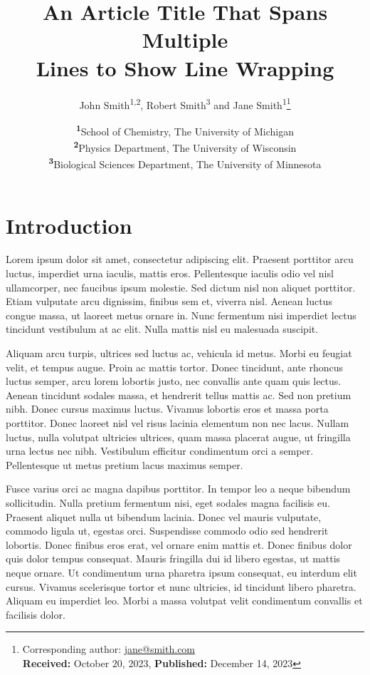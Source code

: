 \documentclass[
a4paper, %
10pt, %
unnumberedsections, %
twoside, %
]{LTJournalArticle}
\title{An Article Title That Spans Multiple\\ Lines to Show Line Wrapping} %
\author{%
	John Smith\textsuperscript{1,2}, Robert Smith\textsuperscript{3} and Jane Smith\textsuperscript{1}\thanks{Corresponding author: \href{mailto:jane@smith.com}{jane@smith.com}\\ \textbf{Received:} October 20, 2023, \textbf{Published:} December 14, 2023}
}
\date{\footnotesize\textsuperscript{\textbf{1}}School of Chemistry, The University of Michigan\\ \textsuperscript{\textbf{2}}Physics Department, The University of Wisconsin\\ \textsuperscript{\textbf{3}}Biological Sciences Department, The University of Minnesota}
\begin{document}
	
	\maketitle %
	
	
	\section{Introduction}
	
	Lorem ipsum dolor sit amet, consectetur adipiscing elit. Praesent porttitor arcu luctus, imperdiet urna iaculis, mattis eros. Pellentesque iaculis odio vel nisl ullamcorper, nec faucibus ipsum molestie. Sed dictum nisl non aliquet porttitor. Etiam vulputate arcu dignissim, finibus sem et, viverra nisl. Aenean luctus congue massa, ut laoreet metus ornare in. Nunc fermentum nisi imperdiet lectus tincidunt vestibulum at ac elit. Nulla mattis nisl eu malesuada suscipit.
	
	Aliquam arcu turpis, ultrices sed luctus ac, vehicula id metus. Morbi eu feugiat velit, et tempus augue. Proin ac mattis tortor. Donec tincidunt, ante rhoncus luctus semper, arcu lorem lobortis justo, nec convallis ante quam quis lectus. Aenean tincidunt sodales massa, et hendrerit tellus mattis ac. Sed non pretium nibh. Donec cursus maximus luctus. Vivamus lobortis eros et massa porta porttitor. Donec laoreet nisl vel risus lacinia elementum non nec lacus. Nullam luctus, nulla volutpat ultricies ultrices, quam massa placerat augue, ut fringilla urna lectus nec nibh. Vestibulum efficitur condimentum orci a semper. Pellentesque ut metus pretium lacus maximus semper.
	
	Fusce varius orci ac magna dapibus porttitor. In tempor leo a neque bibendum sollicitudin. Nulla pretium fermentum nisi, eget sodales magna facilisis eu. Praesent aliquet nulla ut bibendum lacinia. Donec vel mauris vulputate, commodo ligula ut, egestas orci. Suspendisse commodo odio sed hendrerit lobortis. Donec finibus eros erat, vel ornare enim mattis et. Donec finibus dolor quis dolor tempus consequat. Mauris fringilla dui id libero egestas, ut mattis neque ornare. Ut condimentum urna pharetra ipsum consequat, eu interdum elit cursus. Vivamus scelerisque tortor et nunc ultricies, id tincidunt libero pharetra. Aliquam eu imperdiet leo. Morbi a massa volutpat velit condimentum convallis et facilisis dolor.
	
\end{document}
